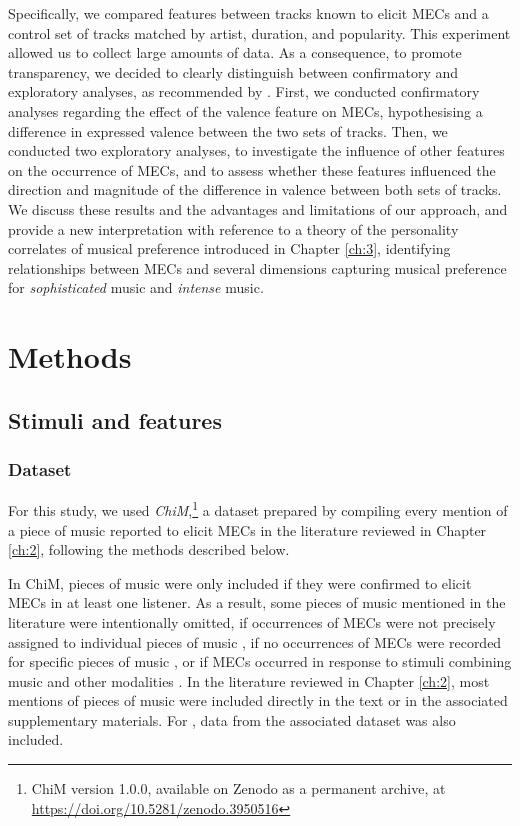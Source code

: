 Specifically, we compared features between tracks known to elicit MECs and a control set of tracks matched by artist, duration, and popularity. This experiment allowed us to collect large amounts of data. As a consequence, to promote transparency, we decided to clearly distinguish between confirmatory and exploratory analyses, as recommended by \textcite{dushoff2019}. First, we conducted confirmatory analyses regarding the effect of the valence feature on MECs, hypothesising a difference in expressed valence between the two sets of tracks. Then, we conducted two exploratory analyses, to investigate the influence of other features on the occurrence of MECs, and to assess whether these features influenced the direction and magnitude of the difference in valence between both sets of tracks. We discuss these results and the advantages and limitations of our approach, and provide a new interpretation with reference to a theory of the personality correlates of musical preference \parencite{rentfrow2011} introduced in Chapter \ref{ch:3}, identifying relationships between MECs and several dimensions capturing musical preference for \emph{sophisticated} music and \emph{intense} music.

\section{Methods}
\label{se:val-methods}

\subsection{Stimuli and features}

\subsubsection{Dataset}

For this study, we used \emph{ChiM},\footnote{ChiM version 1.0.0, available on Zenodo as a permanent archive, at \url{https://doi.org/10.5281/zenodo.3950516}} a dataset prepared by compiling every mention of a piece of music reported to elicit MECs in the literature reviewed in Chapter \ref{ch:2}, following the methods described below.

In ChiM, pieces of music were only included if they were confirmed to elicit MECs in at least one listener. As a result, some pieces of music mentioned in the literature were intentionally omitted, if occurrences of MECs were not precisely assigned to individual pieces of music \parencite[e.g.,][]{masherrero2014}, if no occurrences of MECs were recorded for specific pieces of music \parencite[e.g.,][]{grewe2007}, or if MECs occurred in response to stimuli combining music and other modalities \parencite[e.g.,][]{strick2015}. In the literature reviewed in Chapter \ref{ch:2}, most mentions of pieces of music were included directly in the text or in the associated supplementary materials. For \textcite{bannister2018}, data from the associated dataset \parencite{bannister2017} was also included.

